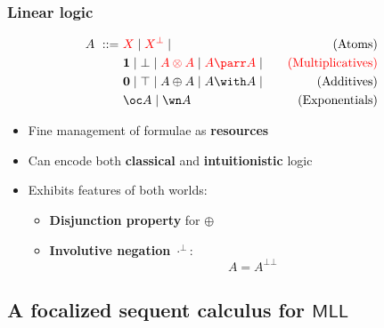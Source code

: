 \documentclass[usenames,dvipsnames]{beamer}
\begin{document}
\begin{frame}
    \frametitle{Linear logic}
    \small
    \begin{align*}
        A ~::=~&{\color{red} X} \mid {\color{red} X^{\bot}} \mid &\quad \text{(Atoms)}\\
        &\textbf{1} \mid \bot \mid {\color{red} A \otimes A} \mid {\color{red} A \parr A} \mid &\quad \text{\color{red} (Multiplicatives)}\\
        &\textbf{0} \mid \top \mid A \oplus A \mid A \with A \mid &\quad \text{(Additives)}\\
        &\oc A \mid \wn A &\quad \text{(Exponentials)}\\
    \end{align*}
    \vspace{-3em}
    \begin{itemize}
        \setlength\itemsep{0.75em}
        \item Fine management of formulae as \textbf{resources}
        \item Can encode both {\bf\color{violet} classical} and {\bf\color{orange} intuitionistic} logic
        \item Exhibits features of both worlds:
        \begin{itemize}
            \item {\bf\color{orange} Disjunction property} for $\oplus$
            \item {\bf\color{violet} Involutive negation} $\cdot^\bot$:
            \large
            $$A = A^{\bot\bot}$$
        \end{itemize}
    \end{itemize}
\end{frame}

\subsection{A focalized sequent calculus for $\mathsf{MLL}$}
\end{document}
